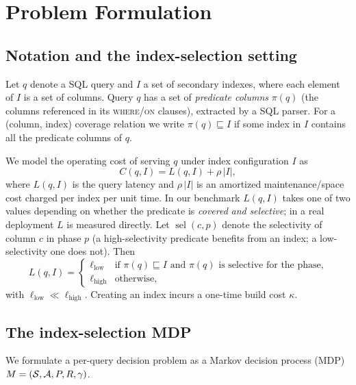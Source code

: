 \section{Problem Formulation}
\label{sec:problem}

\subsection{Notation and the index-selection setting}
Let \(q\) denote a SQL query and \(I\) a set of secondary indexes, where each
element of \(I\) is a set of columns. Query \(q\) has a set of
\emph{predicate columns} \(\pi(q)\) (the columns referenced in its
\textsc{where}/\textsc{on} clauses), extracted by a SQL parser. For a
(column, index) coverage relation we write \(\pi(q) \sqsubseteq I\) if some index
in \(I\) contains all the predicate columns of \(q\).

We model the operating cost of serving \(q\) under index configuration \(I\) as
\begin{equation}
  C(q, I) = L(q, I) + \rho\,|I|,
  \label{eq:cost}
\end{equation}
where \(L(q,I)\) is the query latency and \(\rho\,|I|\) is an amortized
maintenance/space cost charged per index per unit time. In our benchmark
\(L(q,I)\) takes one of two values depending on whether the predicate is
\emph{covered} \emph{and} \emph{selective}; in a real deployment \(L\) is
measured directly. Let \(\operatorname{sel}(c, p)\) denote the selectivity of
column \(c\) in phase \(p\) (a high-selectivity predicate benefits from an index;
a low-selectivity one does not). Then
\begin{equation}
  L(q,I) =
  \begin{cases}
    \ell_{\text{low}} & \text{if } \pi(q)\sqsubseteq I \text{ and } \pi(q)
      \text{ is selective for the phase,}\\
    \ell_{\text{high}} & \text{otherwise,}
  \end{cases}
  \label{eq:latency}
\end{equation}
with \(\ell_{\text{low}} \ll \ell_{\text{high}}\). Creating an index incurs a
one-time build cost \(\kappa\).

\subsection{The index-selection MDP}
We formulate a per-query decision problem as a Markov decision process (MDP)
\(M = (\mathcal{S}, \mathcal{A}, P, R, \gamma)\).

